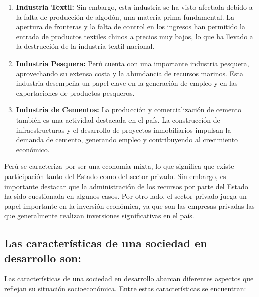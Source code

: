 \documentclass[
  a4paper,
]{article}
\begin{document}
\begin{enumerate}
\def\labelenumi{\arabic{enumi}.}
\item
  \textbf{Industria Textil:} Sin embargo, esta industria se ha visto
  afectada debido a la falta de producción de algodón, una materia prima
  fundamental. La apertura de fronteras y la falta de control en los
  ingresos han permitido la entrada de productos textiles chinos a
  precios muy bajos, lo que ha llevado a la destrucción de la industria
  textil nacional.
\item
  \textbf{Industria Pesquera:} Perú cuenta con una importante industria
  pesquera, aprovechando su extensa costa y la abundancia de recursos
  marinos. Esta industria desempeña un papel clave en la generación de
  empleo y en las exportaciones de productos pesqueros.
\item
  \textbf{Industria de Cementos:} La producción y comercialización de
  cemento también es una actividad destacada en el país. La construcción
  de infraestructuras y el desarrollo de proyectos inmobiliarios
  impulsan la demanda de cemento, generando empleo y contribuyendo al
  crecimiento económico.
\end{enumerate}

Perú se caracteriza por ser una economía mixta, lo que significa que
existe participación tanto del Estado como del sector privado. Sin
embargo, es importante destacar que la administración de los recursos
por parte del Estado ha sido cuestionada en algunos casos. Por otro
lado, el sector privado juega un papel importante en la inversión
económica, ya que son las empresas privadas las que generalmente
realizan inversiones significativas en el país.

\hypertarget{las-caracteruxedsticas-de-una-sociedad-en-desarrollo-son}{%
\subsection{Las características de una sociedad en desarrollo
son:}\label{las-caracteruxedsticas-de-una-sociedad-en-desarrollo-son}}

Las características de una sociedad en desarrollo abarcan diferentes
aspectos que reflejan su situación socioeconómica. Entre estas
características se encuentran:
\end{document}
